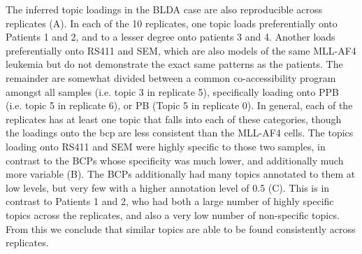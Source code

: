 The inferred topic loadings in the BLDA case are also reproducible across replicates (A). In each of the 10 replicates, one topic loads preferentially onto Patients 1 and 2, and to a lesser degree onto patients 3 and 4. Another loads preferentially onto RS411 and SEM, which are also models of the same MLL-AF4 leukemia but do not demonstrate the exact same patterns as the patients. The remainder are somewhat divided between a common co-accessibility program amongst all samples (i.e. topic 3 in replicate 5), specifically loading onto PPB (i.e. topic 5 in replicate 6), or PB (Topic 5 in replicate 0). In general, each of the replicates has at least one topic that falls into each of these categories, though the loadings onto the \gls{bcp} are less consistent than the MLL-AF4 cells. The topics loading onto RS411 and SEM were highly specific to those two samples, in contrast to the BCPs whose specificity was much lower, and additionally much more variable (B).  The BCPs additionally had many topics annotated to them at low levels, but very few with a higher annotation level of 0.5 (C).  This is in contrast to Patients 1 and 2, who had both a large number of highly specific topics across the replicates, and also a very low number of non-specific topics.  From this we conclude that similar topics are able to be found consistently across replicates.  

